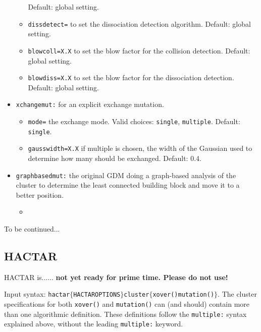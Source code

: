 \documentclass[a4paper,10pt]{scrbook}
\begin{document}
\begin{itemize}
\begin{itemize}
Default: global setting.
    \item \texttt{dissdetect=} to set the dissociation detection algorithm. 
Default: global setting.
    \item \texttt{blowcoll=X.X} to set the blow factor for the collision 
detection. Default: global setting.
    \item \texttt{blowdiss=X.X} to set the blow factor for the dissociation 
detection. Default: global setting.
  \end{itemize}
  \item \texttt{xchangemut:} for an explicit exchange mutation.
  \begin{itemize}
    \item \texttt{mode=} the exchange mode. Valid choices: \texttt{single}, 
\texttt{multiple}. Default: \texttt{single}.
    \item \texttt{gausswidth=X.X} if multiple is chosen, the width of the 
Gaussian used to determine how many should be exchanged. Default: 0.4.
  \end{itemize}
  \item \texttt{graphbasedmut:} the original GDM doing a graph-based analysis 
of the cluster to determine the least connected building block and move it to a 
better position.
  \begin{itemize}
    \item 
  \end{itemize}
\end{itemize}

To be continued... %


\subsection{HACTAR}
\label{sec:geomhactar}
HACTAR is...... \textbf{not yet ready for prime time. Please do not use!} %

Input syntax: 
\texttt{hactar$\{$HACTAROPTIONS$\}$cluster$\{$xover()mutation()$\}$}.  The 
cluster specifications for both \texttt{xover()} and \texttt{mutation()} can 
(and should) contain more than one algorithmic definition. These definitions 
follow the \texttt{multiple:} syntax explained above, without the leading 
\texttt{multiple:} keyword.
\end{document}
